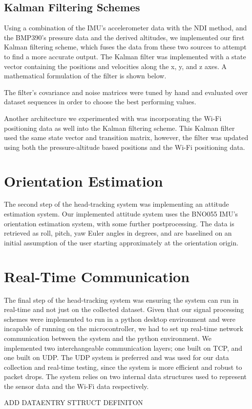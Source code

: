 \subsection{Kalman Filtering Schemes}
Using a combination of the IMU's accelerometer data with the NDI method, and the BMP390's pressure data and the derived altitudes, we implemented our first Kalman filtering scheme, which fuses the data from these two sources to attempt to find a more accurate output. The Kalman filter was implemented with a state vector containing the positions and velocities along the x, y, and z axes. A mathematical formulation of the filter is shown below.
\par
[FILTER MATRICES from code]
\par
The filter's covariance and noise matrices were tuned by hand and evaluated over dataset sequences in order to choose the best performing values.
\par
Another architecture we experimented with was incorporating the Wi-Fi positioning data as well into the Kalman filtering scheme. This Kalman filter used the same state vector and transition matrix, however, the filter was updated using both the pressure-altitude based positions and the Wi-Fi positioning data.

\section{Orientation Estimation}
The second step of the head-tracking system was implementing an attitude estimation system. Our implemented attitude system uses the BNO055 IMU's orientation estimation system, with some further postprocessing. The data is retrieved as roll, pitch, yaw Euler angles in degrees, and are baselined on an initial assumption of the user starting approximately at the orientation origin. \cite{bno}

\section{Real-Time Communication}
The final step of the head-tracking system was ensuring the system can run in real-time and not just on the collected dataset. Given that our signal processing schemes were implemented to run in a python desktop environment and were incapable of running on the microcontroller, we had to set up real-time network communication between the system and the python environment. We implemented two interchangeable communication layers; one built on TCP, and one built on UDP. The UDP system is preferred and was used for our data collection and real-time testing, since the system is more efficient and robust to packet drops. The system relies on two internal data structures used to represent the sensor data and the Wi-Fi data respectively.
\par
ADD DATAENTRY STTRUCT DEFINITON
\par

